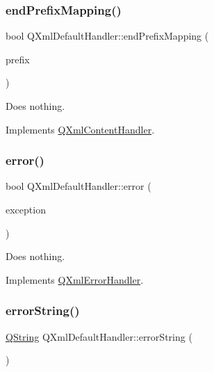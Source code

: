 \subsubsection{\texorpdfstring{endPrefixMapping()}{endPrefixMapping()}}
{\footnotesize\ttfamily bool Q\+Xml\+Default\+Handler\+::end\+Prefix\+Mapping (\begin{DoxyParamCaption}\item[{const \mbox{\hyperlink{class_q_string}{Q\+String}} \&}]{prefix }\end{DoxyParamCaption})\hspace{0.3cm}{\ttfamily [virtual]}}

Does nothing. 

Implements \mbox{\hyperlink{class_q_xml_content_handler_a1c7f3e794c2e763e043eef3229ccf034}{Q\+Xml\+Content\+Handler}}.

\mbox{\label{class_q_xml_default_handler_a2511bdad8a588353b28292266cf6bdd4}} 
\subsubsection{\texorpdfstring{error()}{error()}}
{\footnotesize\ttfamily bool Q\+Xml\+Default\+Handler\+::error (\begin{DoxyParamCaption}\item[{const \mbox{\hyperlink{class_q_xml_parse_exception}{Q\+Xml\+Parse\+Exception}} \&}]{exception }\end{DoxyParamCaption})\hspace{0.3cm}{\ttfamily [virtual]}}

Does nothing. 

Implements \mbox{\hyperlink{class_q_xml_error_handler_aa7e25c4198fa16a0312fd48e5718217c}{Q\+Xml\+Error\+Handler}}.

\mbox{\label{class_q_xml_default_handler_afcbe5fdce86cea4b7863e752c2413c45}} 
\subsubsection{\texorpdfstring{errorString()}{errorString()}}
{\footnotesize\ttfamily \mbox{\hyperlink{class_q_string}{Q\+String}} Q\+Xml\+Default\+Handler\+::error\+String (\begin{DoxyParamCaption}{ }\end{DoxyParamCaption})\hspace{0.3cm}{\ttfamily [virtual]}}

